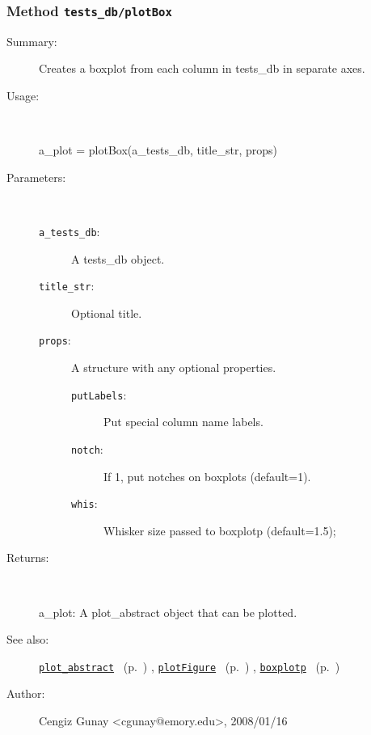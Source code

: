 \subsubsection[Method \texttt{plotBox}]{Method \texttt{tests\_db/plotBox}}%
%
\label{ref_tests_db__plotBox}%
\hypertarget{ref_tests_db__plotBox}{}%
\begin{description}
\item[Summary:]Creates a boxplot from each column in tests\_db in separate axes.
%
\item[Usage:]~%
\begin{lyxcode}%
a\_plot = plotBox(a\_tests\_db, title\_str, props)
%
\end{lyxcode}%
%
%
\item[Parameters:]~
\begin{description}%
\item[\texttt{a\_tests\_db}:]
 A tests\_db object.
\item[\texttt{title\_str}:]
 Optional title.
\item[\texttt{props}:]
 A structure with any optional properties.
\begin{description}%
\item[\texttt{putLabels}:]
 Put special column name labels.
\item[\texttt{notch}:]
 If 1, put notches on boxplots (default=1).
\item[\texttt{whis}:]
 Whisker size passed to boxplotp (default=1.5);
\end{description}%
\end{description}%
%
\item[Returns:
]~

	a\_plot: A plot\_abstract object that can be plotted.
%
%
\item[See also:]%
\hyperlink{ref_plot_abstract}{\texttt{plot\_abstract}}%
\ (p.~\pageref{ref_plot_abstract})%
%
, \hyperlink{ref_plotFigure}{\texttt{plotFigure}}%
\ (p.~\pageref{ref_plotFigure})%
%
, \hyperlink{ref_boxplotp}{\texttt{boxplotp}}%
\ (p.~\pageref{ref_boxplotp})%
%
%
\item[Author:]%
Cengiz Gunay <cgunay@emory.edu>, 2008/01/16
%
\end{description}
\methodline%
